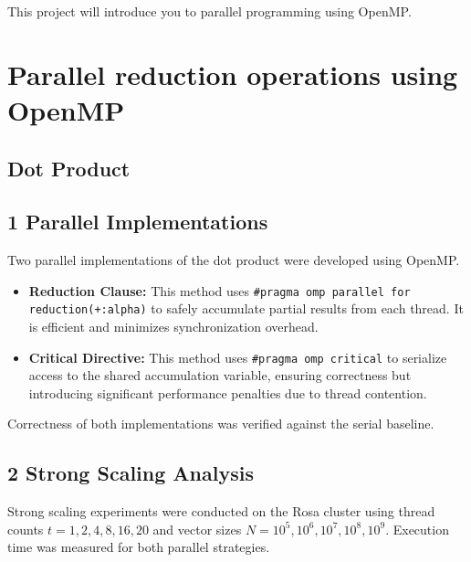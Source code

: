 \documentclass[unicode,11pt,a4paper,oneside,numbers=endperiod,openany]{scrartcl}
\begin{document}
\setassignment

\newline

\assignmentpolicy
This project will introduce you to parallel programming using OpenMP. 

\section{Parallel reduction operations using OpenMP }

\subsection{Dot Product}
\subsection*{1 Parallel Implementations}

Two parallel implementations of the dot product were developed using OpenMP.

\begin{itemize}
    \item \textbf{Reduction Clause:} This method uses \texttt{\#pragma omp parallel for reduction(+:alpha)} to safely accumulate partial results from each thread. It is efficient and minimizes synchronization overhead.
    
    \item \textbf{Critical Directive:} This method uses \texttt{\#pragma omp critical} to serialize access to the shared accumulation variable, ensuring correctness but introducing significant performance penalties due to thread contention.
\end{itemize}

Correctness of both implementations was verified against the serial baseline.



\subsection*{2 Strong Scaling Analysis}

Strong scaling experiments were conducted on the Rosa cluster using thread counts $t = 1, 2, 4, 8, 16, 20$ and vector sizes $N = 10^5, 10^6, 10^7, 10^8, 10^9$. Execution time was measured for both parallel strategies.
\end{document}
